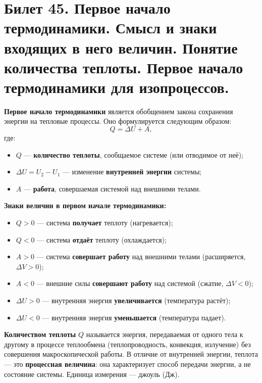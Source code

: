 \section{Билет 45. Первое начало термодинамики. Смысл и знаки входящих в него величин. Понятие количества теплоты. Первое начало термодинамики для изопроцессов.}

\begin{definition}
\textbf{Первое начало термодинамики} является обобщением закона сохранения энергии на тепловые процессы. Оно формулируется следующим образом:
\begin{equation}
    Q = \Delta U + A, \label{eq:first_law_45}
\end{equation}
где:
\begin{itemize}
    \item $Q$ --- \textbf{количество теплоты}, сообщаемое системе (или отводимое от неё);
    \item $\Delta U = U_2 - U_1$ --- изменение \textbf{внутренней энергии} системы;
    \item $A$ --- \textbf{работа}, совершаемая системой над внешними телами.
\end{itemize}
\end{definition}

\begin{definition}
\textbf{Знаки величин в первом начале термодинамики:}
\begin{itemize}
    \item $Q > 0$ --- система \textbf{получает} теплоту (нагревается);
    \item $Q < 0$ --- система \textbf{отдаёт} теплоту (охлаждается);
    \item $A > 0$ --- система \textbf{совершает работу} над внешними телами (расширяется, $\Delta V > 0$);
    \item $A < 0$ --- внешние силы \textbf{совершают работу} над системой (сжатие, $\Delta V < 0$);
    \item $\Delta U > 0$ --- внутренняя энергия \textbf{увеличивается} (температура растёт);
    \item $\Delta U < 0$ --- внутренняя энергия \textbf{уменьшается} (температура падает).
\end{itemize}
\end{definition}

\begin{definition}
\textbf{Количеством теплоты} $Q$ называется энергия, передаваемая от одного тела к другому в процессе теплообмена (теплопроводность, конвекция, излучение) без совершения макроскопической работы. В отличие от внутренней энергии, теплота --- это \textbf{процессная величина}: она характеризует способ передачи энергии, а не состояние системы. Единица измерения --- джоуль (Дж).
\end{definition}

